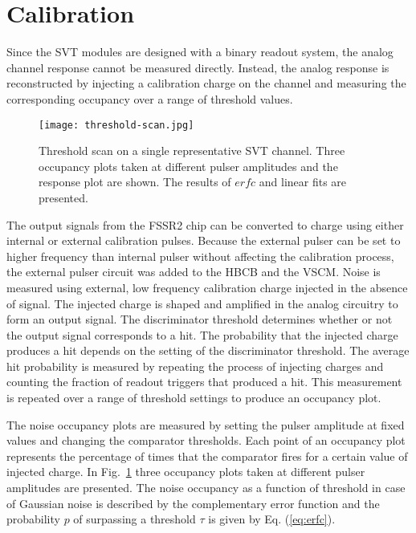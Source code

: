 \section{Calibration}

Since the SVT modules are designed with a binary readout system, the analog channel response cannot be measured directly. Instead, the analog response is reconstructed by injecting a calibration charge on the channel and measuring the corresponding occupancy over a range of threshold values. 

\begin{figure}[hbt] 
	\centering 
	\texttt{[image: threshold-scan.jpg]}
	\caption{Threshold scan on a single representative SVT channel. Three occupancy plots taken at different pulser amplitudes and the response plot are shown. The results of $erfc$ and linear fits are presented.}
	\label{fig:threshold-scan}
\end{figure}

The output signals from the FSSR2 chip can be converted to charge using either internal or external calibration pulses. Because the external pulser can be set to higher frequency than internal pulser without affecting the calibration process, the external pulser circuit was added to the HBCB and the VSCM. Noise is measured using external, low frequency calibration charge injected in the absence of signal. The injected charge is shaped and amplified in the analog circuitry to form an output signal. The discriminator threshold determines whether or not the output signal corresponds to a hit. The probability that the injected charge produces a hit depends on the setting of the discriminator threshold. The average hit probability is measured by repeating the process of injecting charges and counting the fraction of readout triggers that produced a hit. This measurement is repeated over a range of threshold settings to produce an occupancy plot. 

The noise occupancy plots are measured by setting the pulser amplitude at fixed values and changing the comparator thresholds. Each point of an occupancy plot represents the percentage of times that the comparator fires for a certain value of injected charge. In Fig.~\ref{fig:threshold-scan} three occupancy plots taken at different pulser amplitudes are presented. The noise occupancy as a function of threshold in case of Gaussian noise is described by the complementary error function and the probability $p$ of surpassing a threshold $\tau$ is given by Eq. (\ref{eq:erfc}). 

